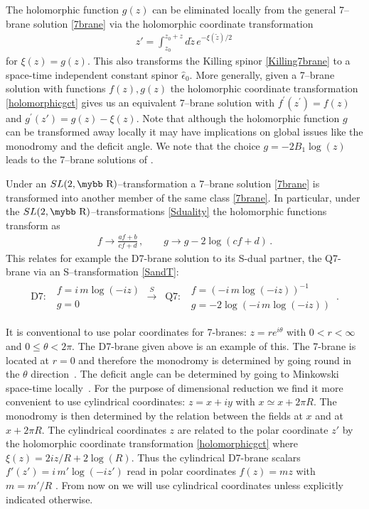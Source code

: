\documentclass[12pt,a4paper]{article}
\def\bb#1{\hbox{\mybb#1}}
\begin{document}
The holomorphic function $g(z)$ can be eliminated locally from the
general 7--brane solution \eqref{7brane} via the holomorphic coordinate
transformation
\begin{align}
  z' = \int_{z_0}^{z_0+z} d \tilde{z} \, e^{-\xi(\tilde{z})/2 }\,
\label{holomorphicgct}
\end{align}
for $\xi(z) = g(z)$.
This also transforms the Killing spinor \eqref{Killing7brane}
to a space-time independent constant spinor $\hat \epsilon_0$.
More generally, given a 7--brane solution
with functions $f(z), g(z)$ the holomorphic coordinate transformation
\eqref{holomorphicgct} gives us an equivalent 7--brane solution with
$f^\prime(z^\prime) = f(z)$ and $g^\prime (z') = g(z) - \xi(z)$.
Note that although the holomorphic function $g$ can be transformed away
locally it may have implications on global issues like the monodromy
and the deficit angle. We note that the choice $g=-2 B_1 \log(z)$
leads to the 7--brane solutions of \cite{Einhorn:2000ct}.


Under an $SL(2,\bb{R})$--transformation a
7--brane solution \eqref{7brane}
is transformed into another member of the same class \eqref{7brane}.
In particular, under the $SL(2,\bb{R})$--transformations \eqref{Sduality}
the holomorphic functions transform as
\begin{align}
  f \rightarrow \frac{af+b}{cf+d} \,, \qquad
  g \rightarrow g - 2 \log(cf+d) \,.
\end{align}
This relates for example
the D7-brane solution to its S-dual partner, the Q7-brane
\cite{Meessen:1998qm} via an S--transformation \eqref{SandT}:
\begin{align}
  \text{D7:~~} \begin{array}{l} f=i\, m \log(-iz) \\ g=0 \end{array}
  \overset{\textstyle S}{\longrightarrow} \;\;
  \text{Q7:~~} \begin{array}{l} f=(-i\, m \log(-iz))^{-1} \\
    g=-2 \log(-i\, m \log(-iz)) \end{array} \,.
\label{conD7toQ7}
\end{align}

It is conventional to use polar coordinates for 7-branes:
$z=re^{i\theta}$ with $0<r<\infty$ and $0\leq \theta< 2\pi$. The
D7-brane given above is an example of this. The 7-brane is located
at $r=0$ and therefore the monodromy is determined by going round
in the $\theta$ direction~\cite{Meessen:1998qm}. The deficit angle
can be determined by going to Minkowski space-time
locally~\cite{Dabholkar:1997zd}. For the purpose of dimensional
reduction we find it more convenient to use cylindrical
coordinates: $z=x+iy$ with $x \simeq x + 2\pi R$.
The monodromy is then determined by the relation
between the fields at $x$ and at $x+ 2 \pi R$. The cylindrical
coordinates $z$ are related to the polar coordinate $z'$ by the
holomorphic coordinate transformation \eqref{holomorphicgct} where
$\xi(z) = 2 i z/R + 2 \log(R)$. Thus the cylindrical D7-brane scalars
$f'(z') =i\, m' \log(-iz')$ read in polar coordinates $f(z) = mz$ with
$m=m'/R$ \cite{Bergshoeff:1996ui}.
From now on we will use cylindrical coordinates unless explicitly
indicated otherwise.
\end{document}
